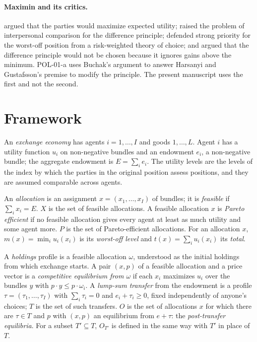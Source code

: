 \documentclass{situationist-preprint}
\begin{document}
\paragraph{Maximin and its critics.} \citet{Harsanyi1975} argued that the parties would maximize expected utility; \citet{Arrow1973} raised the problem of interpersonal comparison for the difference principle; \citet{Buchak2017} defended strong priority for the worst-off position from a risk-weighted theory of choice; and \citet{Gustafsson2018} argued that the difference principle would not be chosen because it ignores gains above the minimum. POL-01-a uses Buchak's argument to answer Harsanyi and Gustafsson's premise to modify the principle. The present manuscript uses the first and not the second.

\section{Framework}\label{s:frame}

\begin{definition}\label{d:economy}
An \emph{exchange economy} has agents $i = 1, \ldots, I$ and goods $1, \ldots, L$. Agent $i$ has a utility function $u_i$ on non-negative bundles and an endowment $e_i$, a non-negative bundle; the aggregate endowment is $E = \sum_i e_i$. The utility levels are the levels of the index by which the parties in the original position assess positions, and they are assumed comparable across agents.
\end{definition}

\begin{definition}\label{d:alloc}
An \emph{allocation} is an assignment $x = (x_1, \ldots, x_I)$ of bundles; it is \emph{feasible} if $\sum_i x_i = E$. $X$ is the set of feasible allocations. A feasible allocation $x$ is \emph{Pareto efficient} if no feasible allocation gives every agent at least as much utility and some agent more. $P$ is the set of Pareto-efficient allocations. For an allocation $x$, $m(x) = \min_i u_i(x_i)$ is its \emph{worst-off level} and $t(x) = \sum_i u_i(x_i)$ its \emph{total}.
\end{definition}

\begin{definition}\label{d:eq}
A \emph{holdings} profile is a feasible allocation $\omega$, understood as the initial holdings from which exchange starts. A pair $(x, p)$ of a feasible allocation and a price vector is a \emph{competitive equilibrium from $\omega$} if each $x_i$ maximizes $u_i$ over the bundles $y$ with $p \cdot y \leq p \cdot \omega_i$. A \emph{lump-sum transfer} from the endowment is a profile $\tau = (\tau_1, \ldots, \tau_I)$ with $\sum_i \tau_i = 0$ and $e_i + \tau_i \geq 0$, fixed independently of anyone's choices; $T$ is the set of such transfers. $O$ is the set of allocations $x$ for which there are $\tau \in T$ and $p$ with $(x, p)$ an equilibrium from $e + \tau$: the \emph{post-transfer equilibria}. For a subset $T' \subseteq T$, $O_{T'}$ is defined in the same way with $T'$ in place of $T$.
\end{definition}
\end{document}
